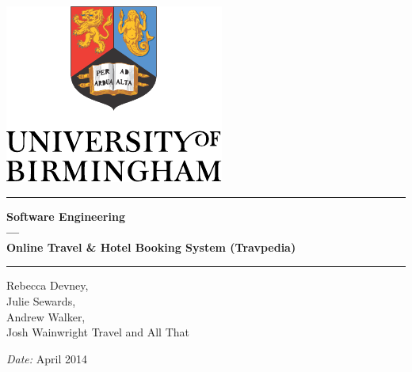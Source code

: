 \begin{titlepage}
	\begin{center}
	\vspace*{\fill}

	\centering
	\includegraphics[scale=1.2]{Logo.pdf}
	\vfill

	\hrule
	{\LARGE\bf Software Engineering \\
		--- \\
		Online Travel \& Hotel Booking System (Travpedia)\\[0.4cm]}
	\hrule

	\vfill

	\vfill
		Rebecca Devney,\\
		Julie Sewards,\\
		Andrew Walker,\\
		Josh Wainwright
	\vfill
	Travel and All That

	\vfill
	\vfill
	\textit{Date:} April 2014
	\vfill
	\vfill

	\end{center}
\end{titlepage}



